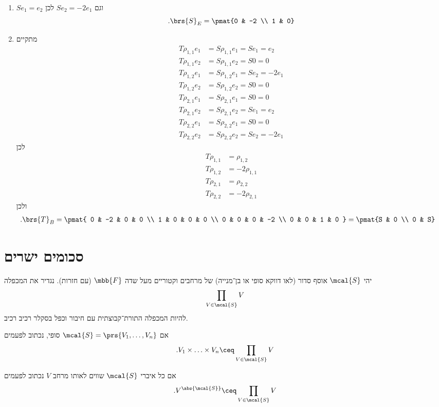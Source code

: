 \documentclass[a4paper,10pt,oneside,openany]{article}
\begin{document}
\begin{solution}
\begin{enumerate}
\item 
$S e_1 = e_2$
וגם
$S e_2 = -2 e_1$
לכן
\[\text{.} \brs{S}_E = \pmat{0 & -2 \\ 1 & 0}\]

\item מתקיים
\begin{align*}
T \rho_{1,1} e_1 &= S \rho_{1,1} e_1 = S e_1 = e_2 \\
T \rho_{1,1} e_2 &= S \rho_{1,1} e_2 = S 0 = 0 \\
T \rho_{1,2} e_1 &= S \rho_{1,2} e_1 = S e_2 = -2 e_1 \\
T \rho_{1,2} e_2 &= S \rho_{1,2} e_2 = S 0 = 0 \\
T \rho_{2,1} e_1 &= S \rho_{2,1} e_1 = S 0 = 0 \\
T \rho_{2,1} e_2 &= S \rho_{2,1} e_2 = S e_1 = e_2 \\
T \rho_{2,2} e_1 &= S \rho_{2,2} e_1 = S 0 = 0 \\
T \rho_{2,2} e_2 &= S \rho_{2,2} e_2 = S e_2 = -2 e_1
\end{align*}
לכן
\begin{align*}
T \rho_{1,1} &= \rho_{1,2} \\
T \rho_{1,2} &= -2\rho_{1,1} \\
T \rho_{2,1} &= \rho_{2,2} \\
T \rho_{2,2} &= -2 \rho_{2,1}
\end{align*}
ולכן
\begin{align*}
\text{.} \brs{T}_B &=
\pmat{
0 & -2 & 0 & 0 \\
1 & 0 & 0 & 0 \\
0 & 0 & 0 & -2 \\
0 & 0 & 1 & 0
} = \pmat{S & 0 \\ 0 & S}
\end{align*}
\end{enumerate}
\end{solution}

\section*{סכומים ישרים}

\begin{definition}
יהי
$\mcal{S}$
אוסף סדור (לאו דווקא סופי או בן־מנייה) של מרחבים וקטוריים מעל שדה
$\mbb{F}$ (עם חזרות).
נגדיר את המכפלה
\[\prod_{V \in \mcal{S}} V\]
להיות המכפלה התורת־קבוצתית עם חיבור וכפל בסקלר רכיב רכיב.

אם
$\mcal{S} = \prs{V_1, \ldots, V_n}$
סופי, נכתוב לפעמים
\[\text{.} V_1 \times \ldots \times V_n \ceq \prod_{V \in \mcal{S}} V\]

אם כל איברי
$\mcal{S}$
שווים לאותו מרחב
$V$
נכתוב לפעמים
\[\text{.} V^{\abs{\mcal{S}}} \ceq \prod_{V \in \mcal{S}} V\]
\end{definition}
\end{document}
